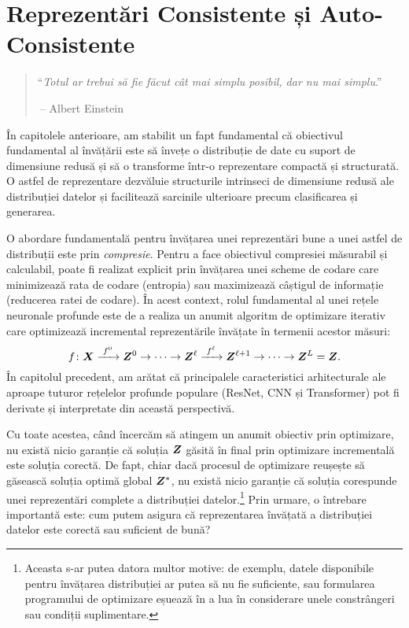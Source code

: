 \documentclass[../../book-main_ro.tex]{subfiles}
\begin{document}
\chapter{Reprezentări Consistente și Auto-Consistente}
\label{ch:consistent}\label{ch:autoencoding}
\label{ch:self-consistent}\label{ch:closed-loop}

\begin{quote}
\hfill  ``{\em Totul ar trebui să fie făcut cât mai simplu posibil, dar nu mai simplu}.''

$~$\hfill -- Albert Einstein
\end{quote}



\vspace{5mm}


În capitolele anterioare, am stabilit un fapt fundamental că
obiectivul fundamental al învățării este să învețe o distribuție
de date cu suport de dimensiune redusă și să o transforme într-o
reprezentare compactă și structurată. O astfel de reprezentare dezvăluie
structurile intrinseci de dimensiune redusă ale distribuției datelor și facilitează
sarcinile ulterioare precum clasificarea și generarea.

O abordare fundamentală pentru învățarea unei reprezentări bune a unei astfel de
distribuții este prin {\em compresie}. Pentru a face
obiectivul compresiei măsurabil și calculabil, poate fi realizat
explicit prin învățarea unei scheme de codare care minimizează rata de codare (entropia) sau maximizează câștigul de informație (reducerea
ratei de codare). În acest context, rolul fundamental al unei rețele neuronale
profunde este de a realiza un anumit algoritm de optimizare iterativ care
optimizează incremental reprezentările învățate în termenii acestor măsuri:
\begin{equation}
  f\colon \bm{X}
  \xrightarrow{\hspace{1mm} f^0 \hspace{1mm}} \bm{Z}^0 \rightarrow \cdots
  \rightarrow \bm{Z}^\ell \xrightarrow{\hspace{1mm} f^\ell \hspace{1mm}}
  \bm{Z}^{\ell+1} \rightarrow  \cdots \to \bm{Z}^L = \bm{Z}.
\end{equation}
În capitolul precedent, am arătat că principalele caracteristici arhitecturale
ale aproape tuturor rețelelor profunde populare (ResNet, CNN și
Transformer) pot fi derivate și interpretate din această perspectivă.

Cu toate acestea, când încercăm să atingem un anumit obiectiv prin
optimizare, nu există nicio garanție că soluția $\bm{Z}$ găsită
în final prin optimizare incrementală este soluția corectă. De fapt, chiar dacă
procesul de optimizare reușește să găsească soluția
optimă global $\bm{Z}^*$, nu există nicio garanție că soluția corespunde
unei reprezentări complete a distribuției datelor.\footnote{Aceasta s-ar putea datora multor motive: de exemplu, datele disponibile pentru învățarea distribuției ar putea să nu fie suficiente, sau formularea programului de optimizare eșuează în a lua în considerare unele constrângeri sau condiții suplimentare.} Prin urmare, o întrebare importantă este: cum putem asigura că reprezentarea învățată a distribuției datelor este
corectă sau suficient de bună?
\end{document}
